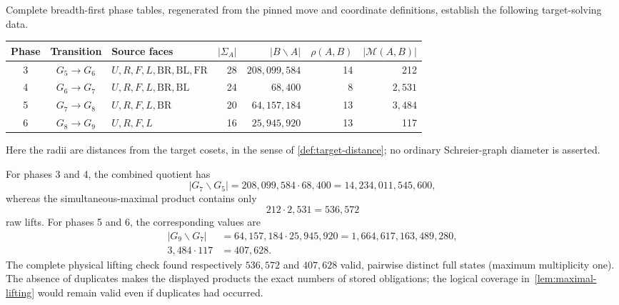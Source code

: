 \begin{proposition}
\label{prop:phase-data}
Complete breadth-first phase tables, regenerated from the pinned move and
coordinate definitions, establish the following target-solving data.
\begin{center}
\begingroup
\small
\setlength{\tabcolsep}{3.5pt}
\begin{tabularx}{\textwidth}{@{}cc>{\raggedright\arraybackslash}Xrrrr@{}}
\toprule
Phase & Transition & Source faces & $|\Sigma_A|$ & $|B\backslash A|$
  & $\rho(A,B)$ & $|\mathcal M(A,B)|$ \\
\midrule
3 & $G_5\to G_6$ & $U,R,F,L,\mathrm{BR},\mathrm{BL},\mathrm{FR}$
  & 28 & $208{,}099{,}584$ & 14 & 212 \\
4 & $G_6\to G_7$ & $U,R,F,L,\mathrm{BR},\mathrm{BL}$
  & 24 & $68{,}400$ & 8 & $2{,}531$ \\
5 & $G_7\to G_8$ & $U,R,F,L,\mathrm{BR}$
  & 20 & $64{,}157{,}184$ & 13 & $3{,}484$ \\
6 & $G_8\to G_9$ & $U,R,F,L$
  & 16 & $25{,}945{,}920$ & 13 & 117 \\
\bottomrule
\end{tabularx}
\endgroup
\end{center}
Here the radii are distances from the target cosets, in the sense of
\cref{def:target-distance}; no ordinary Schreier-graph diameter is asserted.
\end{proposition}

For phases 3 and 4, the combined quotient has
\begin{equation}
  |G_7\backslash G_5|
    =208{,}099{,}584\cdot68{,}400
    =14{,}234{,}011{,}545{,}600,
  \label{eq:pair34-quotient-size}
\end{equation}
whereas the simultaneous-maximal product contains only
\begin{equation}
  212\cdot2{,}531=536{,}572
  \label{eq:pair34-frontier-size}
\end{equation}
raw lifts.  For phases 5 and 6, the corresponding values are
\begin{align}
  |G_9\backslash G_7|
    &=64{,}157{,}184\cdot25{,}945{,}920
      =1{,}664{,}617{,}163{,}489{,}280,
  \label{eq:pair56-quotient-size}\\
  3{,}484\cdot117&=407{,}628.
  \label{eq:pair56-frontier-size}
\end{align}
The complete physical lifting check found respectively $536{,}572$ and
$407{,}628$ valid, pairwise distinct full states (maximum multiplicity one).
The absence of duplicates makes the displayed products the exact numbers of
stored obligations; the logical coverage in~\cref{lem:maximal-lifting} would
remain valid even if duplicates had occurred.

